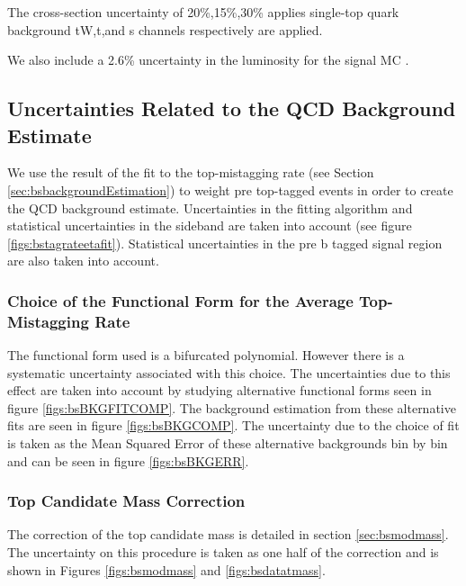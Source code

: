 The cross-section uncertainty of 20\%,15\%,30\% applies single-top quark background tW,t,and s channels respectively are applied.

We also include a 2.6\% uncertainty in the luminosity for the signal MC \cite{CMS-PAS-LUM-13-001}. 


\clearpage
\subsection{Uncertainties Related to the QCD Background Estimate}
We use the result of the fit to the top-mistagging rate (see Section \ref{sec:bsbackgroundEstimation}) to weight 
pre top-tagged events in order to create the QCD background estimate.  Uncertainties in
the fitting algorithm and statistical uncertainties in the sideband
are taken into account (see figure \ref{figs:bstagrateetafit}).
Statistical uncertainties in the pre b tagged signal region are also
taken into account.

\subsubsection{Choice of the Functional Form for the Average Top-Mistagging Rate}
\label{sec:bschoiceoffit}
The functional form used is a bifurcated polynomial.
However there is a systematic uncertainty associated with this choice.
The uncertainties due to this effect are taken into account by
studying alternative functional forms seen in figure
\ref{figs:bsBKGFITCOMP}.  The background estimation from these
alternative fits are seen in figure \ref{figs:bsBKGCOMP}.  The
uncertainty due to the choice of fit is taken as the Mean Squared
Error of these alternative backgrounds bin by bin and can be seen in
figure \ref{figs:bsBKGERR}.  

\subsubsection{Top Candidate Mass Correction}
\label{sec:bsmascorrerror}
The correction of the top candidate mass is detailed in section \ref{sec:bsmodmass}.  The uncertainty on this procedure is taken as one half of the correction 
and is shown in Figures \ref{figs:bsmodmass} and \ref{figs:bsdatatmass}.   

